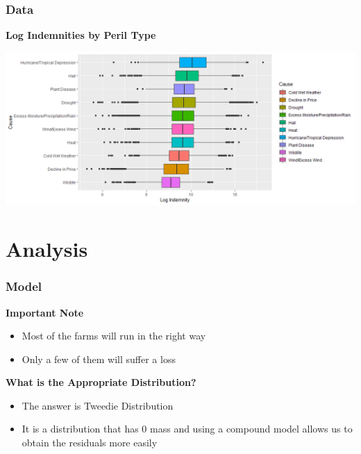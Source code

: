 \documentclass[serif,10pt,aspectratio=169]{beamer}
\begin{document}
\begin{frame}
\frametitle{Data}
\textbf{Log Indemnities by Peril Type}
\begin{center}\includegraphics[width=13.5cm]{YumaImages/ByPerilType.png}\end{center}
\end{frame}


\section{Analysis}


\begin{frame}
\frametitle{Model}
\textbf{Important Note}
\begin{itemize}
\item Most of the farms will run in the right way
\item Only a few of them will suffer a loss
\end{itemize}
\textbf{What is the Appropriate Distribution?}
\begin{itemize}
\item The answer is Tweedie Distribution
\item It is a distribution that has 0 mass and using a compound model allows us to obtain the residuals more easily
\end{itemize}
\end{frame}
\end{document}
